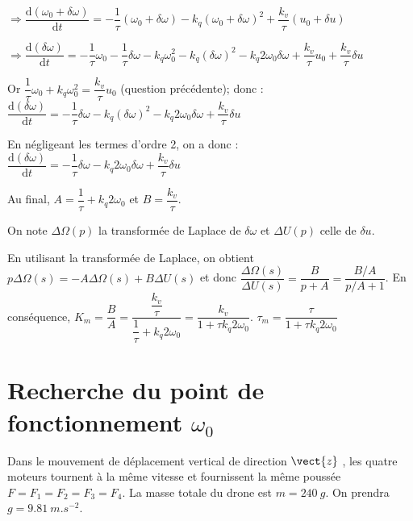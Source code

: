 \begin{multicols}{2}
\begin{corrige}
$
\Rightarrow 
\dfrac{\text{d}\left( \omega_0+\delta \omega \right)}{\text{d}t}=-\dfrac{1}{\tau}\left( \omega_0+\delta \omega\right) -k_q\left( \omega_0+\delta\omega \right)^2 + \dfrac{k_v}{\tau}\left( u_0+\delta u\right)
$

$
\Rightarrow 
\dfrac{\text{d}\left(\delta \omega \right)}{\text{d}t}=-\dfrac{1}{\tau} \omega_0-\dfrac{1}{\tau}\delta \omega -k_q \omega_0^2-k_q\left(\delta\omega\right)^2 -k_q2 \omega_0 \delta\omega + \dfrac{k_v}{\tau} u_0+\dfrac{k_v}{\tau} \delta u
$

Or $\dfrac{1}{\tau}\omega_0 +k_q\omega_0^2 = \dfrac{k_v}{\tau}u_0$ (question précédente); donc :
$
\dfrac{\text{d}\left(\delta \omega \right)}{\text{d}t}= -\dfrac{1}{\tau}\delta \omega-k_q\left(\delta\omega\right)^2 -k_q2 \omega_0 \delta\omega + \dfrac{k_v}{\tau} \delta u
$

En négligeant les termes d'ordre 2, on a donc : 
$
\dfrac{\text{d}\left(\delta \omega \right)}{\text{d}t}= -\dfrac{1}{\tau}\delta \omega -k_q2 \omega_0 \delta\omega + \dfrac{k_v}{\tau} \delta u
$

Au final, $A=\dfrac{1}{\tau}+k_q2 \omega_0$ et $B=\dfrac{k_v}{\tau}$.
\end{corrige}
\else
\fi
On note $\Delta \Omega (p)$ la transformée de Laplace de $\delta \omega$ et $\Delta U(p)$ celle de $\delta u$.


\ifprof
\begin{corrige}
En utilisant la transformée de Laplace, on obtient $p\Delta\Omega(s) = -A\Delta\Omega(s) + B \Delta U(s)$ et donc 
 $\dfrac{\Delta{\Omega(s)}}{\Delta U(s)}= \dfrac{B}{p+A} = \dfrac{B/A}{p/A+1}  $. 
 En conséquence, $K_m = \dfrac{B}{A} = \dfrac{\dfrac{k_v}{\tau}}{\dfrac{1}{\tau}+k_q2 \omega_0}= \dfrac{k_v}{1+\tau k_q2 \omega_0}$. 
 $\tau_m = \dfrac{\tau}{1+\tau k_q2 \omega_0} $ 
\end{corrige}
\else
\fi
\section*{Recherche du point de fonctionnement $\omega_0$}
\ifprof
\else
Dans le mouvement de déplacement vertical de direction $\vect{z}$ , les quatre moteurs tournent à la même vitesse et fournissent la même poussée $F=F_1=F_2=F_3=F_4$.
La masse totale du drone est $m=\SI{240}{g}$. On prendra $g=\SI{9,81}{m.s^{-2}}$.
\fi



\end{multicols}
